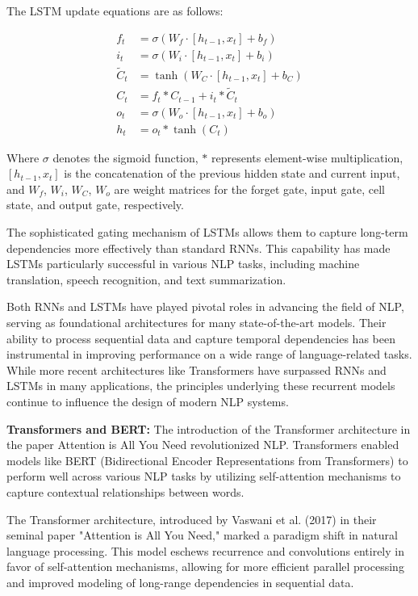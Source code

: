 The LSTM update equations are as follows:

\begin{align}
f_t &= \sigma(W_f \cdot [h_{t-1}, x_t] + b_f) \\
i_t &= \sigma(W_i \cdot [h_{t-1}, x_t] + b_i) \\
\tilde{C}_t &= \tanh(W_C \cdot [h_{t-1}, x_t] + b_C) \\
C_t &= f_t * C_{t-1} + i_t * \tilde{C}_t \\
o_t &= \sigma(W_o \cdot [h_{t-1}, x_t] + b_o) \\
h_t &= o_t * \tanh(C_t)
\end{align}

Where $\sigma$ denotes the sigmoid function, $*$ represents element-wise multiplication, $[h_{t-1}, x_t]$ is the concatenation of the previous hidden state and current input, and $W_f$, $W_i$, $W_C$, $W_o$ are weight matrices for the forget gate, input gate, cell state, and output gate, respectively.

The sophisticated gating mechanism of LSTMs allows them to capture long-term dependencies more effectively than standard RNNs. This capability has made LSTMs particularly successful in various NLP tasks, including machine translation, speech recognition, and text summarization.

Both RNNs and LSTMs have played pivotal roles in advancing the field of NLP, serving as foundational architectures for many state-of-the-art models. Their ability to process sequential data and capture temporal dependencies has been instrumental in improving performance on a wide range of language-related tasks. While more recent architectures like Transformers have surpassed RNNs and LSTMs in many applications, the principles underlying these recurrent models continue to influence the design of modern NLP systems.

\textbf{Transformers and BERT:} The introduction of the Transformer architecture in the paper Attention is All You Need revolutionized NLP. Transformers enabled models like BERT (Bidirectional Encoder Representations from Transformers) to perform well across various NLP tasks by utilizing self-attention mechanisms to capture contextual relationships between words.

The Transformer architecture, introduced by Vaswani et al. (2017) in their seminal paper "Attention is All You Need," marked a paradigm shift in natural language processing. This model eschews recurrence and convolutions entirely in favor of self-attention mechanisms, allowing for more efficient parallel processing and improved modeling of long-range dependencies in sequential data.


